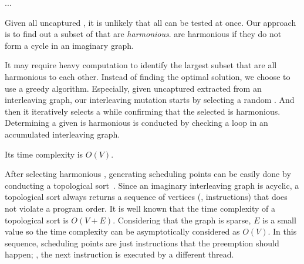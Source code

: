 ...






%
Given all uncaptured \segments, it is unlikely that all \segments can
be tested at once.
%
Our approach is to find out a subset of \segments that are
\textit{harmonious}. \Segments are harmonious if they do not form a
cycle in an imaginary graph.


It may require heavy computation to identify the largest subset that
are all harmonious to each other.
%
Instead of finding the optimal solution, we choose to use a greedy
algorithm.
%
Especially, given uncaptured \segments extracted from an interleaving
graph, our interleaving mutation starts by selecting a random
\segment.
%
And then it iteratively selects a \segment while confirming that the
selected \segment is harmonious.
%
Determining a given \segment is harmonious is conducted by checking a
loop in an accumulated interleaving graph.

Its time complexity is $O(V)$.


%
After selecting harmonious \segments, generating scheduling points can
be easily done by conducting a topological
sort~\cite{topologicalsort}.
%
Since an imaginary interleaving graph is acyclic, a topological sort
always returns a sequence of vertices (\ie, instructions) that does
not violate a program order.
%
It is well known that the time complexity of a topological sort is
$O(V+E)$. Considering that the graph is sparse, $E$ is a small value
so the time complexity can be asymptotically considered as $O(V)$.
%
In this sequence, scheduling points are just instructions that the
preemption should happen; \ie, the next instruction is executed by a
different thread.
%




